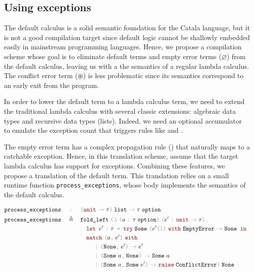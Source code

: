 \documentclass[11pt,a4paper]{article}
\newcommand{\synvar}[1]{\ensuremath{#1}}
\newcommand{\synkeyword}[1]{\textcolor{red!60!black}{\texttt{#1}}}
\newcommand{\synpunct}[1]{\textcolor{black!40!white}{\texttt{#1}}}
\newcommand{\synlet}{\synkeyword{let~}}
\newcommand{\synin}{\synkeyword{~in~}}
\newcommand{\synequal}{\synpunct{~=~}}
\newcommand{\syntyped}{~\synpunct{:}~}
\newcommand{\syncomma}{\synpunct{,}}
\newcommand{\syndot}{\synpunct{.}~}
\newcommand{\synunit}{\synpunct{()}}
\newcommand{\synunitt}{\synkeyword{unit}}
\newcommand{\synlambda}{\synpunct{$\lambda$}~}
\newcommand{\synlparen}{\synpunct{(}}
\newcommand{\synrparen}{\synpunct{)}}
\newcommand{\synmid}{\synpunct{~$|$~}}
\newcommand{\synemptydefault}{\synvar{\varnothing}}
\newcommand{\synerror}{\synvar{\circledast}}
\newcommand{\synarrow}{~\synpunct{$\rightarrow$}~}
\newcommand{\synnone}{\texttt{None}}
\newcommand{\synsome}{\texttt{Some}~}
\newcommand{\synmatch}{\synkeyword{match}~}
\newcommand{\synwith}{~\synkeyword{with}~}
\newcommand{\synoption}{\;\texttt{option}}
\newcommand{\synraise}{\synkeyword{raise}\;}
\newcommand{\synemptyerror}{\texttt{EmptyError}}
\newcommand{\synconflicterror}{\texttt{ConflictError}}
\newcommand{\syntry}{\synkeyword{try}\;}
\newcommand{\synlist}{\;\texttt{list}}
\begin{document}
\subsection{Using exceptions}

The default calculus is a solid semantic foundation for the Catala language,
but it is not a good compilation target since default logic cannot be shallowly
embedded easily in mainstream programming languages. Hence, we propose a
compilation scheme whose goal is to eliminate default terms and empty error 
terms (\synemptydefault) from the default calculus, leaving us with a the semantics of a
regular lambda calculus. The conflict error term (\synerror) is less problematic 
since its semantics correspond to an early exit from the program.

In order to lower the default term to a lambda calculus term, we need to extend 
the traditional lambda calculus with several classic extensions: algebraic 
data types and recursive data types (lists). Indeed, we need an optional 
accumulator to emulate the exception count that triggers rules like
 and .

The empty error term has a complex propagation rule ()
that naturally maps to a catchable exception. Hence, in this translation scheme,
assume that the target lambda calculus has support for exceptions. Combining these 
features, we propose a translation of the default term. This translation relies 
on a small runtime function \texttt{process\_exceptions}, whose body 
implements the semantics of the default calculus. 


\begin{align*}
  \texttt{process\_exceptions}\quad&\syntyped&&
  \synlparen\synunitt\synarrow\synvar{\tau}\synrparen\synlist\synarrow\synvar{\tau}\synoption\\
  \texttt{process\_exceptions}\quad&\triangleq&&
  \texttt{fold\_left}\;\synlparen\synlambda\synlparen\synvar{a}\syntyped
  \synvar{\tau}\synoption\synrparen\;
  \synlparen\synvar{e'}\syntyped
  \synunitt\synarrow\synvar{\tau}\synrparen\syndot\\
  &&&\quad\synlet\synvar{e'}\syntyped\synvar{\tau}\synequal\syntry
  \synsome\synlparen\synvar{e'}\synunit\synrparen
  \synwith\synemptyerror\synarrow \synnone\synin\\
  &&&\quad\synmatch\synlparen\synvar{a}\syncomma\;\synvar{e'}\synrparen\synwith\\
  &&&\quad\quad\synmid\synlparen\synnone\syncomma\;\synvar{e'}\synrparen\synarrow\synvar{e'}\\
  &&&\quad\quad\synmid\synlparen\synsome\synvar{a}\syncomma\;\synnone\synrparen\synarrow
  \synsome\synvar{a}\\
  &&&\quad\quad\synmid\synlparen\synsome\synvar{a}\syncomma\;\synsome
  \synvar{e'}\synrparen\synarrow \synraise\synconflicterror \synrparen\;\synnone
\end{align*}
\end{document}
